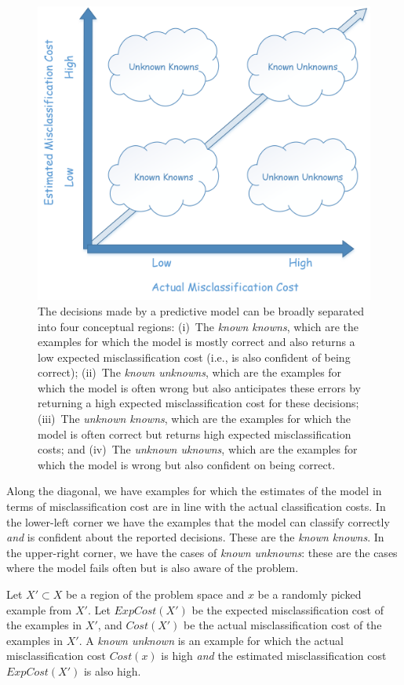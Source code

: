 \begin{figure}[t]
\centering
\includegraphics[width=0.5\columnwidth]{plots/Quadrant.png}
\caption{The decisions made by a predictive model can be broadly separated into four conceptual regions: (i)~The \emph{known knowns}, which are the examples for which the model is mostly correct and also returns a low expected misclassification cost (i.e., is also confident of being correct); (ii)~The \emph{known unknowns}, which are the examples for which the model is often wrong but also anticipates these errors by returning a high expected misclassification cost for these decisions; (iii)~The \emph{unknown knowns}, which are the examples for which the model is often correct but returns high expected misclassification costs; and (iv)~The \emph{unknown uknowns}, which are the examples for which the model is wrong but also confident on being correct.}
\label{fig:quadrant}
\end{figure}

Along the diagonal, we have examples for which the estimates of the model in terms of misclassification cost are in line with the actual classification costs. In the lower-left corner we have the examples that the model can classify correctly \emph{and} is confident about the reported decisions. These are the \emph{known knowns}. In the upper-right corner, we have the cases of \emph{known unknowns}: these are the cases where the model fails often but is also aware of the problem.

\begin{definition}
\label{def:ku}
Let $X' \subset X$ be a region of the problem space and $x$ be a randomly picked example from $X'$. 
Let $\mathit{ExpCost}(X')$ be the expected misclassification cost of the examples in $X'$, and $\mathit{Cost}(X')$ be the actual misclassification cost of the examples in $X'$. A \emph{known unknown} is an example for which the actual misclassification cost $\mathit{Cost}(x)$ is high \emph{and} the estimated misclassification cost $\mathit{ExpCost}(X')$ is also high.\smartqed
\end{definition}

